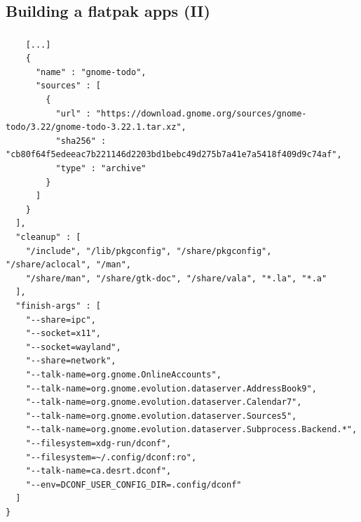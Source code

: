 \subsection{Building a flatpak apps (II)}
\begin{frame}[fragile]
  \frametitle{\insertsubsection}

    \begin{tiny}
\begin{verbatim}
    [...]
    {
      "name" : "gnome-todo",
      "sources" : [
        {
          "url" : "https://download.gnome.org/sources/gnome-todo/3.22/gnome-todo-3.22.1.tar.xz",
          "sha256" : "cb80f64f5edeeac7b221146d2203bd1bebc49d275b7a41e7a5418f409d9c74af",
          "type" : "archive"
        }
      ]
    }
  ],
  "cleanup" : [
    "/include", "/lib/pkgconfig", "/share/pkgconfig", "/share/aclocal", "/man",
    "/share/man", "/share/gtk-doc", "/share/vala", "*.la", "*.a"
  ],
  "finish-args" : [
    "--share=ipc",
    "--socket=x11",
    "--socket=wayland",
    "--share=network",
    "--talk-name=org.gnome.OnlineAccounts",
    "--talk-name=org.gnome.evolution.dataserver.AddressBook9",
    "--talk-name=org.gnome.evolution.dataserver.Calendar7",
    "--talk-name=org.gnome.evolution.dataserver.Sources5",
    "--talk-name=org.gnome.evolution.dataserver.Subprocess.Backend.*",
    "--filesystem=xdg-run/dconf",
    "--filesystem=~/.config/dconf:ro",
    "--talk-name=ca.desrt.dconf",
    "--env=DCONF_USER_CONFIG_DIR=.config/dconf"
  ]
}
\end{verbatim}
    \end{tiny}
\end{frame}

